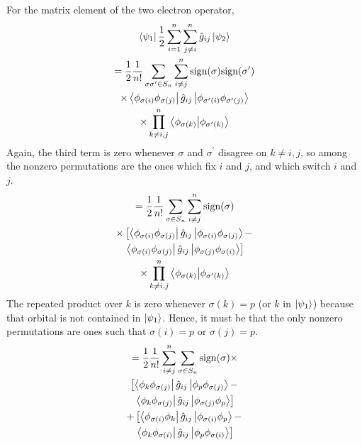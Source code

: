 \documentclass[final,3p,times,twocolumn]{elsarticle}
\begin{document}
\begin{enumerate}
	For the matrix element of the two electron operator,
	\begin{gather}
	\bra{\psi_1}\frac{1}{2}\sum_{i=1}^n\sum_{j\neq i}^n \hat g_{ij}\ket{\psi_2} \\
	\begin{gathered}
	= \frac{1}{2}\frac{1}{n!}\sum_{\sigma\sigma^\prime\in S_n} \sum_{i \neq j}^n \text{sign}(\sigma)\text{sign}(\sigma^\prime) \\
	\times \bra{\phi_{\sigma(i)}\phi_{\sigma(j)}}\hat g_{ij} \ket{\phi_{\sigma^\prime(i)}\phi_{\sigma^\prime(j)}} \\
	\times \prod_{k \neq i,j}^n \bra{\phi_{\sigma(k)}}\ket{\phi_{\sigma^\prime(k)}}
	\end{gathered}
	\end{gather}
	Again, the third term is zero whenever $\sigma$ and $\sigma^\prime$ disagree on $k \neq i,j$, so among the nonzero permutations are the ones which fix $i$ and $j$, and which switch $i$ and $j$.
	\begin{gather} \label{eq:gexp}
	\begin{gathered}
	= \frac{1}{2}\frac{1}{n!} \sum_{\sigma \in S_n} \sum_{i \neq j}^n  \text{sign}(\sigma) \\ \times \left[ \bra{\phi_{\sigma(i)}\phi_{\sigma(j)}}\hat g_{ij} \ket{\phi_{\sigma(i)}\phi_{\sigma(j)}} - \right.\\ \left. \bra{\phi_{\sigma(i)}\phi_{\sigma(j)}}\hat g_{ij} \ket{\phi_{\sigma(j)}\phi_{\sigma(i)}} \right] \\
	\times \prod_{k \neq i,j}^n \bra{\phi_{\sigma(k)}}\ket{\phi_{\sigma^\prime(k)}}
	\end{gathered}
	\end{gather}
	The repeated product over $k$ is zero whenever $\sigma(k) = p$ (or $k$ in $\ket{\psi_1}$) because that orbital is not contained in $\ket{\psi_1}$. Hence, it must be that the only nonzero permutations are ones such that $\sigma(i) = p$ or $\sigma(j) = p$.
	\begin{gather}
	\begin{gathered}
	= \frac{1}{2}\frac{1}{n!} \sum_{i \neq j}^n \sum_{\sigma\in S_n} \text{sign}(\sigma) \times \\ \left[ \bra{\phi_{k}\phi_{\sigma(j)}}\hat g_{ij} \ket{\phi_{p}\phi_{\sigma(j)}} - \right.
	\\ \left. \bra{\phi_{k}\phi_{\sigma(j)}}\hat g_{ij} \ket{\phi_{\sigma(j)}\phi_{p}} \right] \\
	+ \left[ \bra{\phi_{\sigma(i)}\phi_{k}}\hat g_{ij} \ket{\phi_{\sigma(i)}\phi_{p}} - \right.\\ \left. \bra{\phi_{k}\phi_{\sigma(i)}}\hat g_{ij} \ket{\phi_{p}\phi_{\sigma(i)}} \right] 

\end{gathered}
\end{gather}
\end{enumerate}
\end{document}
